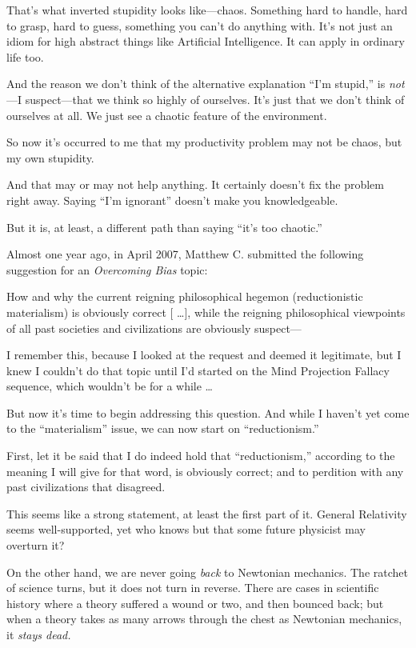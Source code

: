 {
 That's what inverted stupidity looks like---chaos.
Something hard to handle, hard to grasp, hard to guess, something you
can't do anything with. It's not just
an idiom for high abstract things like Artificial Intelligence. It can
apply in ordinary life too.}

{
 And the reason we don't think of the alternative
explanation ``I'm
stupid,'' is \textit{not}{}---I suspect---that we
think so highly of ourselves. It's just that we
don't think of ourselves at all. We just see a chaotic
feature of the environment.}

{
 So now it's occurred to me that my productivity
problem may not be chaos, but my own stupidity.}

{
 And that may or may not help anything. It certainly
doesn't fix the problem right away. Saying
``I'm ignorant''
doesn't make you knowledgeable.}

{
 But it is, at least, a different path than saying
``it's too
chaotic.''}

\myendsectiontext


{
 Almost one year ago, in April 2007, Matthew C. submitted the
following suggestion for an \textit{Overcoming Bias} topic:}

{
 How and why the current reigning philosophical hegemon
(reductionistic materialism) is obviously correct [ \ldots ], while the
reigning philosophical viewpoints of all past societies and
civilizations are obviously suspect---}

{
 I remember this, because I looked at the request and deemed it
legitimate, but I knew I couldn't do that topic until
I'd started on the Mind Projection Fallacy sequence,
which wouldn't be for a while \ldots}

{
 But now it's time to begin addressing this
question. And while I haven't yet come to the
``materialism'' issue, we can now
start on ``reductionism.''}

{
 First, let it be said that I do indeed hold that
``reductionism,'' according to the
meaning I will give for that word, is obviously correct; and to
perdition with any past civilizations that disagreed.}

{
 This seems like a strong statement, at least the first part of it.
General Relativity seems well-supported, yet who knows but that some
future physicist may overturn it?}

{
 On the other hand, we are never going \textit{back} to Newtonian
mechanics. The ratchet of science turns, but it does not turn in
reverse. There are cases in scientific history where a theory suffered
a wound or two, and then bounced back; but when a theory takes as many
arrows through the chest as Newtonian mechanics, it \textit{stays
dead.}}

